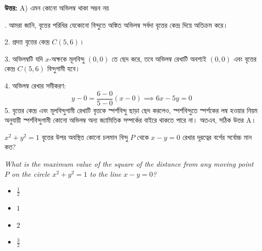 \documentclass[12pt, a4paper]{article}
\begin{document}
\vspace{0.5em}
\begin{tcolorbox}[answerbox]
    \textbf{\color{success} উত্তর:} A) এমন কোনো অভিলম্ব থাকা সম্ভব নয়
\end{tcolorbox}
\vspace{1em}

\begin{tcolorbox}[solutionbox={সমাধান (Solution)}]
    . আমরা জানি, বৃত্তের পরিধির যেকোনো বিন্দুতে অঙ্কিত অভিলম্ব সর্বদা বৃত্তের কেন্দ্র দিয়ে অতিক্রম করে।
    
    \vspace{0.5em}
    2. প্রদত্ত বৃত্তের কেন্দ্র $C(5, 6)$।
    
    3. অভিলম্বটি যদি $x$-অক্ষকে মূলবিন্দু $(0, 0)$ তে ছেদ করে, তবে অভিলম্ব রেখাটি অবশ্যই $(0, 0)$ এবং বৃত্তের কেন্দ্র $C(5, 6)$ বিন্দুগামী হবে।
    
    4. অভিলম্ব রেখার সমীকরণ:
    \[ y - 0 = \frac{6 - 0}{5 - 0}(x - 0) \implies 6x - 5y = 0 \]
    5. বৃত্তের কেন্দ্র এবং মূলবিন্দুগামী রেখাটি বৃত্তকে স্পর্শবিন্দু ছাড়া ছেদ করলেও, স্পর্শবিন্দুতে স্পর্শকের লম্ব হওয়ার নিয়ম অনুযায়ী স্পর্শবিন্দুগামী কোনো অভিলম্ব অন্য জ্যামিতিক সম্পর্কের বাইরে থাকতে পারে না। অতএব, সঠিক উত্তর A।
\end{tcolorbox}

\begin{tcolorbox}[questionbox={প্রশ্ন (Question) 27}]
    \noindent
    $x^2 + y^2 = 1$ বৃত্তের উপর অবস্থিত কোনো চলমান বিন্দু $P$ থেকে $x - y = 0$ রেখার দূরত্বের বর্গের সর্বোচ্চ মান কত?
    
    \vspace{0.8em}
    \begin{english}
    \noindent\textit{\color{darkgray}
    What is the maximum value of the square of the distance from any moving point $P$ on the circle $x^2 + y^2 = 1$ to the line $x - y = 0$?
    }
    \end{english}
\end{tcolorbox}

\begin{itemize}[label={}, leftmargin=1cm, itemsep=0.5em]
    \item[\textbf{A)}] $\frac{1}{2}$
    \item[\textbf{B)}] $1$
    \item[\textbf{C)}] $2$
    \item[\textbf{D)}] $\frac{3}{2}$
\end{itemize}
\end{document}
